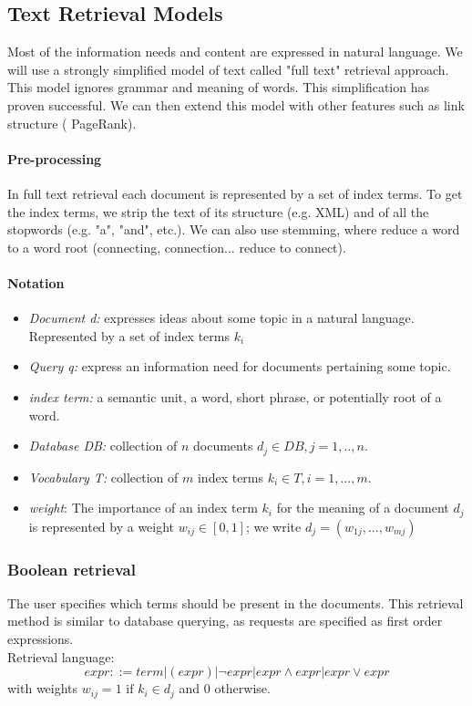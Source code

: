 \subsection{Text Retrieval Models}

Most of the information needs and content are expressed in natural language. We will use a strongly simplified model of text called "full text" retrieval approach. This model ignores grammar and meaning of words. This simplification has proven successful. We can then extend this model with other features such as link structure ( PageRank).


\paragraph{Pre-processing}

In full text retrieval each document is represented by a set of index terms. To get the index terms, we strip the text of its structure (e.g. XML) and of all the stopwords (e.g. "a", "and", etc.). We can also use stemming, where reduce a word to a word root ({connecting, connection...} reduce to connect). 

\paragraph{Notation}
\begin{itemize}
\item \textit{Document d:} expresses ideas about some topic in a natural language. Represented by a set of index terms $k_i$
\item \textit{Query q:} express an information need for documents pertaining some topic.
\item \textit{index term:} a semantic unit, a word, short phrase, or potentially root of a word.
\item \textit{Database DB:} collection of $n$ documents $d_j \in DB, j=1,..,n$.
\item \textit{Vocabulary T:} collection of $m$ index terms $k_i \in T, i=1,...,m$.
\item \textit{weight}: The importance of an index term $k_i$ for the meaning of a document $d_j$ is represented by a weight $w_{ij} \in [0,1]$; we write $d_j = (w_{1j},...,w_{mj})$
\end{itemize}

\subsubsection{Boolean retrieval}
The user specifies which terms should be present in the documents. This retrieval method is similar to database querying, as requests are specified as first order expressions.
\\
Retrieval language:
\[ expr ::= term|(expr)|\neg expr|expr\land expr|expr \lor expr 
\]
with weights $w_{ij} = 1\text{ if }k_i \in d_j$ and $0$ otherwise.
